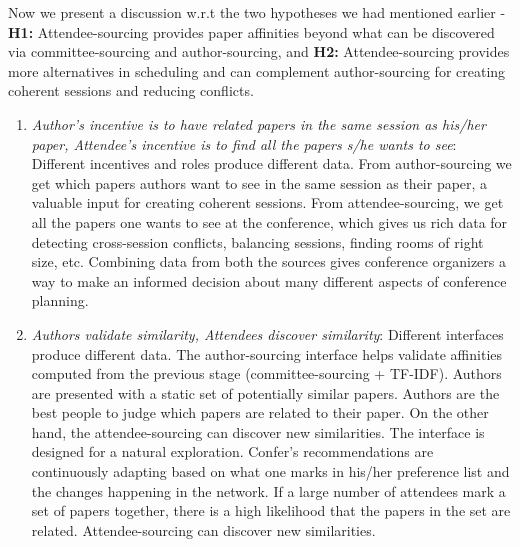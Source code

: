 \documentclass[letterpaper]{article}
\begin{document}
Now we present a discussion w.r.t the two hypotheses we had mentioned earlier - \textbf{H1:} Attendee-sourcing provides paper affinities beyond what can be discovered via committee-sourcing and author-sourcing, and \textbf{H2:} Attendee-sourcing provides more alternatives in scheduling and can complement author-sourcing for creating coherent sessions and reducing conflicts.
\begin{enumerate}
\item \emph{Author's incentive is to have related papers in the same session as his/her paper, Attendee's incentive is to find all the papers s/he wants to see}: Different incentives and roles produce different data. From author-sourcing we get which papers authors want to see in the same session as their paper, a valuable input for creating coherent sessions. From attendee-sourcing, we get all the papers one wants to see at the conference, which gives us rich data for detecting cross-session conflicts, balancing sessions, finding rooms of right size, etc. Combining data from both the sources gives conference organizers a way to make an informed decision about many different aspects of conference planning.

\item \emph{Authors validate similarity, Attendees discover similarity}: Different interfaces produce different data. The author-sourcing interface helps validate affinities computed from the previous stage (committee-sourcing + TF-IDF). Authors are presented with a static set of potentially similar papers. Authors are the best people to judge which papers are related to their paper. On the other hand, the attendee-sourcing can discover new similarities. The interface is designed for a natural exploration. Confer's recommendations are continuously adapting based on what one marks in his/her preference list and the changes happening in the network. If a large number of attendees mark a set of papers together, there is a high likelihood that the papers in the set are related. Attendee-sourcing can discover new similarities.


\end{enumerate}
\end{document}
